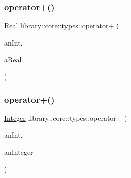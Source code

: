 \subsubsection{\texorpdfstring{operator+()}{operator+()}\hspace{0.1cm}{\footnotesize\ttfamily [1/2]}}
{\footnotesize\ttfamily \mbox{\hyperlink{classlibrary_1_1core_1_1types_1_1_real}{Real}} library\+::core\+::types\+::operator+ (\begin{DoxyParamCaption}\item[{const \mbox{\hyperlink{classlibrary_1_1core_1_1types_1_1_real_a9c5c8826b7e5a8e39544d23fea6c0e1c}{Real\+::\+Value\+Type}} \&}]{an\+Int,  }\item[{const \mbox{\hyperlink{classlibrary_1_1core_1_1types_1_1_real}{Real}} \&}]{a\+Real }\end{DoxyParamCaption})}

\mbox{\label{namespacelibrary_1_1core_1_1types_a129fe9eb5778273d662e141e23779fc3}} 
\subsubsection{\texorpdfstring{operator+()}{operator+()}\hspace{0.1cm}{\footnotesize\ttfamily [2/2]}}
{\footnotesize\ttfamily \mbox{\hyperlink{classlibrary_1_1core_1_1types_1_1_integer}{Integer}} library\+::core\+::types\+::operator+ (\begin{DoxyParamCaption}\item[{const \mbox{\hyperlink{classlibrary_1_1core_1_1types_1_1_integer_a623afb1580f870fd8a1997b1c12c917d}{Integer\+::\+Value\+Type}} \&}]{an\+Int,  }\item[{const \mbox{\hyperlink{classlibrary_1_1core_1_1types_1_1_integer}{Integer}} \&}]{an\+Integer }\end{DoxyParamCaption})}

\mbox{\label{namespacelibrary_1_1core_1_1types_aa2f110a872c6e9c28d5bfdd8ca4a8a28}} 
